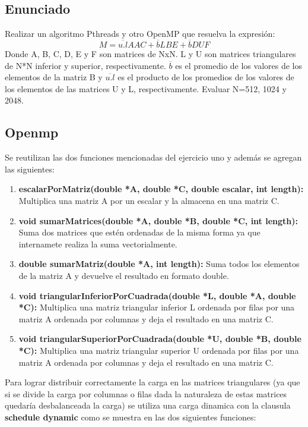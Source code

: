 \subsection{Enunciado}
Realizar un algoritmo Pthreads y otro OpenMP que resuelva la expresión:
$$ M = \overline{u.l}AAC + \overline{b}LBE + \overline{b}DUF $$
Donde A, B, C, D, E y F son matrices de NxN. L y U son matrices
triangulares de N*N inferior y superior, respectivamente. $\overline{b}$ es el promedio de los valores de los elementos de la matriz B y $\overline{u.l}$ es el producto de los promedios de los valores de los elementos de las matrices U y L, respectivamente. Evaluar N=512, 1024 y 2048.

\subsection{Openmp}

Se reutilizan las dos funciones mencionadas del ejercicio uno y además se agregan las siguientes:

\begin{enumerate}
\item \textbf{escalarPorMatriz(double *A, double *C, double escalar, int length):} Multiplica una matriz A por un escalar y la almacena en una matriz C.
\item \textbf{void sumarMatrices(double *A, double *B, double *C, int length):} Suma dos matrices que estén ordenadas de la misma forma ya que internamete realiza la suma vectorialmente.
\item \textbf{double sumarMatriz(double *A, int length):} Suma todos los elementos de la matriz A y devuelve el resultado en formato double.
\item \textbf{void triangularInferiorPorCuadrada(double *L, double *A, double *C):} Multiplica una matriz triangular inferior L ordenada por filas por una matriz A ordenada por columnas y deja el resultado en una matriz C.
\item \textbf{void triangularSuperiorPorCuadrada(double *U, double *B, double *C):} Multiplica una matriz triangular superior U ordenada por filas por una matriz A ordenada por columnas y deja el resultado en una matriz C.
\end{enumerate}

Para lograr distribuir correctamente la carga en las matrices triangulares (ya que si se divide la carga por columnas o filas dada la naturaleza de estas matrices quedaría desbalanceada la carga) se utiliza una carga dinamica con la clausula \textbf{schedule dynamic} como se muestra en las dos siguientes funciones:

